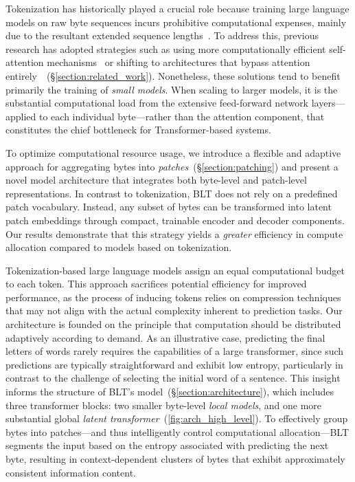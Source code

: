 Tokenization has historically played a crucial role because training large language models on raw byte sequences incurs prohibitive computational expenses, mainly due to the resultant extended sequence lengths~\citep{xue2022byt5}. To address this, previous research has adopted strategies such as using more computationally efficient self-attention mechanisms~\citep{el2020characterbert, clark2022canine} or shifting to architectures that bypass attention entirely~\citep{wang2024mambabyte}~(\S\ref{section:related_work}). Nonetheless, these solutions tend to benefit primarily the training of \textit{small models}. When scaling to larger models, it is the substantial computational load from the extensive feed-forward network layers—applied to each individual byte—rather than the attention component, that constitutes the chief bottleneck for Transformer-based systems.

To optimize computational resource usage, we introduce a flexible and adaptive approach for aggregating bytes into \textit{patches}~(\S\ref{section:patching}) and present a novel model architecture that integrates both byte-level and patch-level representations. In contrast to tokenization, {\textsc BLT} does not rely on a predefined patch vocabulary. Instead, any subset of bytes can be transformed into latent patch embeddings through compact, trainable encoder and decoder components. Our results demonstrate that this strategy yields a \textit{greater} efficiency in compute allocation compared to models based on tokenization.

Tokenization-based large language models assign an equal computational budget to each token. This approach sacrifices potential efficiency for improved performance, as the process of inducing tokens relies on compression techniques that may not align with the actual complexity inherent to prediction tasks. Our architecture is founded on the principle that computation should be distributed adaptively according to demand. As an illustrative case, predicting the final letters of words rarely requires the capabilities of a large transformer, since such predictions are typically straightforward and exhibit low entropy, particularly in contrast to the challenge of selecting the initial word of a sentence. This insight informs the structure of {\textsc BLT}'s model~(\S\ref{section:architecture}), which includes three transformer blocks: two smaller byte-level \textit{local models}, and one more substantial global \textit{latent transformer}~(\autoref{fig:arch_high_level}). 
To effectively group bytes into patches—and thus intelligently control computational allocation—{\textsc BLT} segments the input based on the entropy associated with predicting the next byte, resulting in context-dependent clusters of bytes that exhibit approximately consistent information content.

